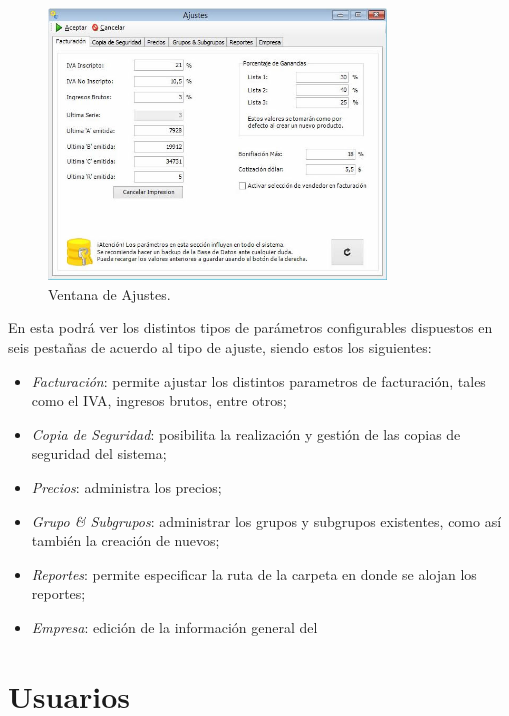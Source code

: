 \documentclass{book}
\begin{document}
\begin{figure}[H]
	\centering
	\includegraphics[width=0.8\textwidth]{images/ventanas/ventana-19.jpg}
	\caption{Ventana de Ajustes.}
	\medskip
\end{figure}
\bigskip

En esta podrá ver los distintos tipos de parámetros configurables dispuestos en seis pestañas de acuerdo al tipo de ajuste, siendo estos los siguientes:

\begin{itemize}
	\renewcommand{\labelitemi}{\scriptsize\tiny$\blacksquare$} 
	\itemsep=3pt \topsep=0pt \partopsep=0pt \parskip=0pt \parsep=0pt
	
	\item \textit{Facturación}: permite ajustar los distintos parametros de facturación, tales como el IVA, ingresos brutos, entre otros;
	\item \textit{Copia de Seguridad}: posibilita la realización y gestión de las copias de seguridad del sistema;
	\item \textit{Precios}: administra los precios;
	\item \textit{Grupo \& Subgrupos}: administrar los grupos y subgrupos existentes, como así también la creación de nuevos;
	\item \textit{Reportes}: permite especificar la ruta de la carpeta en donde se alojan los reportes;
	\item \textit{Empresa}: edición de la información general del

\end{itemize}
\medskip


\section{Usuarios}
\end{document}
